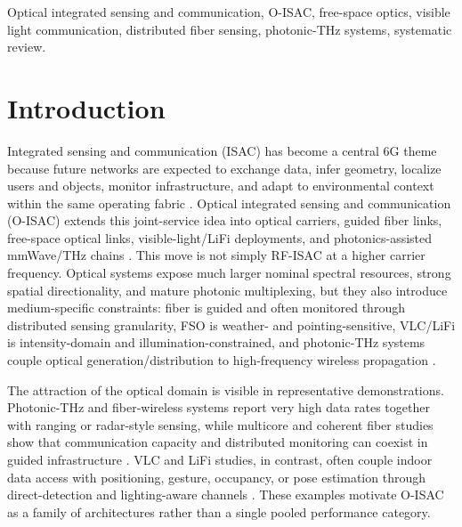 \documentclass[letterpaper,journal]{IEEEtran}
\begin{document}
\begin{IEEEkeywords}
    Optical integrated sensing and communication, O-ISAC, free-space optics, visible light communication, distributed fiber sensing, photonic-THz systems, systematic review.
\end{IEEEkeywords}



\section{Introduction}
\label{introduction}

Integrated sensing and communication (ISAC) has become a central 6G theme because future networks are expected to exchange data, infer geometry, localize users and objects, monitor infrastructure, and adapt to environmental context within the same operating fabric \cite{O_ISAC_070,O_ISAC_162}. Optical integrated sensing and communication (O-ISAC) extends this joint-service idea into optical carriers, guided fiber links, free-space optical links, visible-light/LiFi deployments, and photonics-assisted mmWave/THz chains \cite{O_ISAC_021,O_ISAC_068,O_ISAC_303}. This move is not simply RF-ISAC at a higher carrier frequency. Optical systems expose much larger nominal spectral resources, strong spatial directionality, and mature photonic multiplexing, but they also introduce medium-specific constraints: fiber is guided and often monitored through distributed sensing granularity, FSO is weather- and pointing-sensitive, VLC/LiFi is intensity-domain and illumination-constrained, and photonic-THz systems couple optical generation/distribution to high-frequency wireless propagation \cite{O_ISAC_006,O_ISAC_023,O_ISAC_039,O_ISAC_070}.

The attraction of the optical domain is visible in representative demonstrations. Photonic-THz and fiber-wireless systems report very high data rates together with ranging or radar-style sensing, while multicore and coherent fiber studies show that communication capacity and distributed monitoring can coexist in guided infrastructure \cite{O_ISAC_016,O_ISAC_029,O_ISAC_043,O_ISAC_044,O_ISAC_046,O_ISAC_105}. VLC and LiFi studies, in contrast, often couple indoor data access with positioning, gesture, occupancy, or pose estimation through direct-detection and lighting-aware channels \cite{O_ISAC_009,O_ISAC_022,O_ISAC_039,O_ISAC_050,O_ISAC_062}. These examples motivate O-ISAC as a family of architectures rather than a single pooled performance category.
\end{document}
